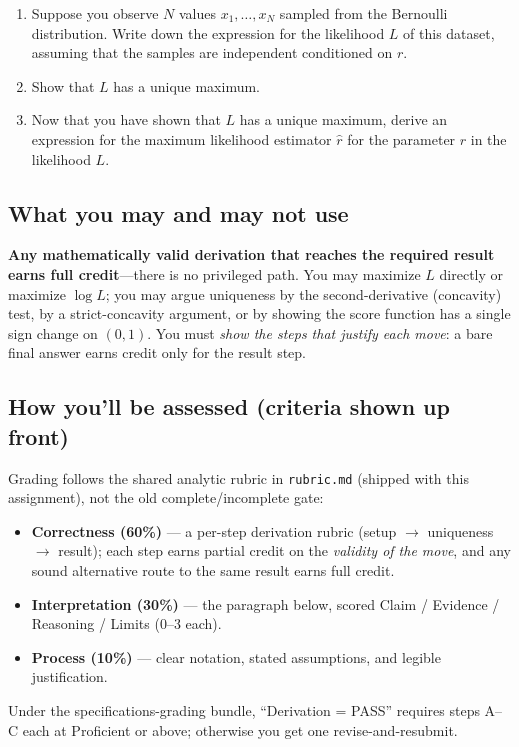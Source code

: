 \documentclass[11pt]{article}
\begin{document}
\begin{enumerate}
    \item Suppose you observe $N$ values $x_1, \dots, x_N$ sampled from the
        Bernoulli distribution. Write down the expression for the likelihood
        $L$ of this dataset, assuming that the samples are independent
        conditioned on $r$.
    \item Show that $L$ has a unique maximum.
    \item Now that you have shown that $L$ has a unique maximum, derive an
        expression for the maximum likelihood estimator $\hat{r}$
        for the parameter $r$ in the likelihood $L$.
\end{enumerate}

\subsection*{What you may and may not use}

\noindent \textbf{Any mathematically valid derivation that reaches the required
result earns full credit}---there is no privileged path. You may maximize $L$
directly or maximize $\log L$; you may argue uniqueness by the second-derivative
(concavity) test, by a strict-concavity argument, or by showing the score
function has a single sign change on $(0,1)$. You must \emph{show the steps that
justify each move}: a bare final answer earns credit only for the result step.

\subsection*{How you'll be assessed (criteria shown up front)}

\noindent Grading follows the shared analytic rubric in \texttt{rubric.md}
(shipped with this assignment), not the old complete/incomplete gate:
\begin{itemize}
    \item \textbf{Correctness (60\%)} --- a per-step derivation rubric (setup
        $\to$ uniqueness $\to$ result); each step earns partial credit on the
        \emph{validity of the move}, and any sound alternative route to the same
        result earns full credit.
    \item \textbf{Interpretation (30\%)} --- the paragraph below, scored
        Claim / Evidence / Reasoning / Limits (0--3 each).
    \item \textbf{Process (10\%)} --- clear notation, stated assumptions, and
        legible justification.
\end{itemize}
Under the specifications-grading bundle, ``Derivation = PASS'' requires steps
A--C each at Proficient or above; otherwise you get one revise-and-resubmit.
\end{document}
